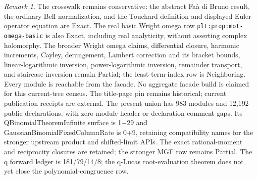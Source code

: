 \documentclass[11pt,oneside]{article}
\theoremstyle{definition}
\theoremstyle{remark}
\newtheorem{remark}[theorem]{Remark}
\begin{document}
\begin{remark}
The crosswalk remains conservative: the abstract Fa\`a di Bruno result, the
ordinary Bell normalization, and the Touchard definition and displayed
Euler-operator equation are Exact.  The real basic Wright omega row
\nolinkurl{plt:prop:mot-omega-basic} is also Exact, including real analyticity,
without asserting complex holomorphy.  The broader Wright omega claims,
differential closure,
harmonic increments, Cayley, derangement, Lambert correction and its bracket
bounds, linear-logarithmic inversion, power-logarithmic inversion, remainder
transport, and staircase inversion remain Partial; the least-term-index row
is Neighboring.  Every module is reachable from the facade.  No aggregate facade
build is claimed for this current-tree census.  The title-page pin remains historical; current publication receipts are external.
The present union has 983 modules and 12,192 public declarations, with zero
module-header or declaration-comment gaps.  Its QBinomialTheoremInfinite
surface is 1+29 and GaussianBinomialFixedColumnRate is 0+9, retaining
compatibility names for the stronger upstream product and shifted-limit APIs.
The exact rational-moment and reciprocity closures are retained; the stronger
MGF row remains Partial.  The q forward ledger is 181/79/14/8; the q-Lucas
root-evaluation theorem does not yet close the polynomial-congruence row.


\end{remark}
\end{document}
